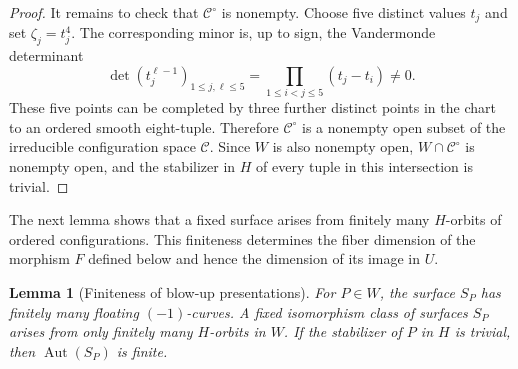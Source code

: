 \documentclass[11pt]{article}
\theoremstyle{plain}
\newtheorem{lemma}[lemma]{Lemma}
\theoremstyle{definition}
\theoremstyle{remark}
\begin{document}
\begin{proof}
It remains to check that \(\mathcal C^\circ\) is nonempty. Choose five
distinct values \(t_j\) and set \(\zeta_j=t_j^4\). The corresponding
minor is, up to sign, the Vandermonde determinant
\[
\det(t_j^{\ell-1})_{1\leq j,\ell\leq5}
=\prod_{1\leq i<j\leq5}(t_j-t_i)\ne0.
\]
These five points can be completed by three further distinct points in the
chart to an ordered smooth eight-tuple. Therefore \(\mathcal C^\circ\) is a
nonempty open subset of the irreducible configuration space \(\mathcal C\).
Since \(W\) is also nonempty open, \(W\cap\mathcal C^\circ\) is nonempty
open, and the stabilizer in \(H\) of every tuple in this intersection is
trivial.
\end{proof}

The next lemma shows that a fixed surface arises from finitely many
\(H\)-orbits of ordered configurations. This finiteness determines the
fiber dimension of the morphism \(F\) defined below and hence the
dimension of its image in \(U\).

\begin{lemma}[Finiteness of blow-up presentations]
\label{lem:X10-finite-presentations}
For \(P\in W\), the surface \(S_P\) has finitely many floating
\((-1)\)-curves. A fixed isomorphism class of surfaces \(S_P\)
arises from only finitely many \(H\)-orbits in \(W\).
If the stabilizer of \(P\) in \(H\) is trivial, then
\(\operatorname{Aut}(S_P)\) is finite.
\end{lemma}
\end{document}
